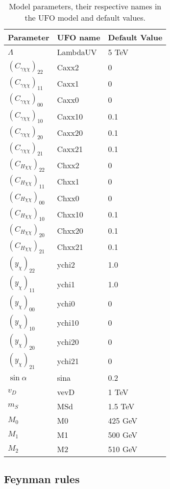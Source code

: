 \documentclass[a4paper,11pt]{article}
\begin{document}
\begin{table}[h!]   \centering
	\vspace{0.2cm}
	\caption{Model parameters, their respective names in the UFO model and default values.\label{tab:parameters}}
	\begin{tabular}{p{2cm}|p{3cm}|p{3cm}}
		\toprule
		\textbf{Parameter} & \textbf{UFO name} & \textbf{Default Value}\\ \toprule 
		$\Lambda$  & LambdaUV & 5 TeV\\
		$(C_{\gamma \chi\chi})_{22}$  & Caxx2 & 0\\
		$(C_{\gamma \chi\chi})_{11}$  & Caxx1 & 0\\
		$(C_{\gamma \chi\chi})_{00}$  & Caxx0 & 0\\
		$(C_{\gamma \chi\chi})_{10}$  & Caxx10 & 0.1\\
		$(C_{\gamma \chi\chi})_{20}$  & Caxx20 & 0.1\\
		$(C_{\gamma \chi\chi})_{21}$  & Caxx21 & 0.1\\
		$(C_{H \chi\chi})_{22}$  & Chxx2 & 0\\
		$(C_{H \chi\chi})_{11}$  & Chxx1 & 0\\
		$(C_{H \chi\chi})_{00}$  & Chxx0 & 0\\
		$(C_{H \chi\chi})_{10}$  & Chxx10 & 0.1\\
		$(C_{H \chi\chi})_{20}$  & Chxx20 & 0.1\\
		$(C_{H \chi\chi})_{21}$  & Chxx21 & 0.1\\
		$(y_\chi)_{22}$  & ychi2 & 1.0\\
		$(y_\chi)_{11}$  & ychi1 & 1.0\\
		$(y_\chi)_{00}$  & ychi0 & 0\\
		$(y_\chi)_{10}$  & ychi10 & 0\\
		$(y_\chi)_{20}$  & ychi20 & 0\\
		$(y_\chi)_{21}$  & ychi21 & 0\\
		$\sin\alpha$  & sina & 0.2\\
		$v_D$  & vevD & 1 TeV\\
		$m_S$ & MSd & 1.5 TeV\\ 
		$M_0$ & M0 & 425 GeV\\
		$M_1$ & M1 & 500 GeV\\
		$M_2$ & M2 & 510 GeV\\
		\bottomrule        
	\end{tabular}
\end{table}


\subsection*{Feynman rules}
\end{document}
